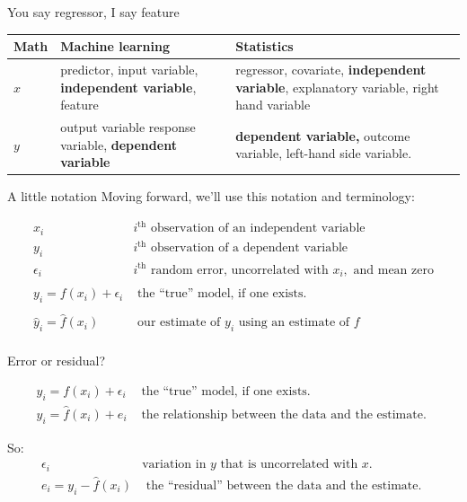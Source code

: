 \documentclass[aspectratio=169, handout]{beamer}
\begin{document}
\begin{frame}{You say regressor, I say feature}

\begin{table}[]
\begin{tabular}{lp{5cm}p{5cm}}
 \textbf{Math} & \textbf{Machine learning} & \textbf{Statistics}  \\
 \hline
 \hline
  $x$& predictor, input variable, \textbf{independent variable}, feature & regressor, covariate, \textbf{independent variable}, explanatory variable, right hand variable \\
 $y$ &  output variable response variable, \textbf{dependent variable} & \textbf{dependent variable,} outcome variable, left-hand side variable.
\end{tabular}
\end{table}

\end{frame}


\begin{frame}{A little notation}
Moving forward, we'll use this notation and terminology:

\begin{eqnarray*}
x_i & i^\text{th} \text{ observation of an independent variable}\\
y_i & i^\text{th} \text{ observation of a dependent variable}\\
\epsilon_i & i^\text{th} \text{ random error, uncorrelated with }x_i,\text{ and mean zero}\\\\
y_i = f(x_i) + \epsilon_i & \text{ the ``true'' model, if one exists. }\\\\
\hat{y}_i = \hat{f}(x_i)  & \text{ our estimate of }y_i\text{ using an estimate of }f\\\end{eqnarray*}
\end{frame}

\begin{frame}{Error or residual?}

\begin{eqnarray*}
y_i = f(x_i) + \epsilon_i & \text{ the ``true'' model, if one exists. }\\
y_i = \hat{f}(x_i) + e_i & \text{ the relationship between the data and the estimate. }
\end{eqnarray*}

\hspace{5mm}
\pause

So:
\begin{eqnarray*}
\epsilon_i&\text{variation in $y$ that is uncorrelated with $x$.}\\
e_i = y_i - \hat{f}(x_i) & \text{ the ``residual'' between the data and the estimate. }
\end{eqnarray*}

\end{frame}
\end{document}
